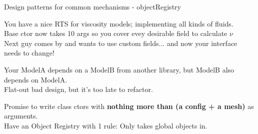 \begin{frame}[fragile]{Design patterns for common mechanisms - objectRegistry}

\begin{description}
    \item[Scenario 1\hspace{2cm}] \hspace{\linewidth}
        You have a nice RTS for viscosity models; implementing all kinds of fluids.\\
        Base ctor now takes 10 args so you cover evey desirable field to calculate $\nu$\\
        Next guy comes by and wants to use custom fields... and now your interface needs to change!\\
    \item[Scenario 2\hspace{2cm}] \hspace{\linewidth}
        Your ModelA depends on a ModelB from another library, but ModelB also depends on ModelA.\\
        Flat-out bad design, but it's too late to refactor.\\
    \item<2>[Solution\hspace{2cm}] \hspace{\linewidth}
        Promise to write class ctors with {\bf nothing more than (a config + a mesh)} as arguments.\\ 
        Have an Object Registry with 1 rule: Only takes global objects in.\\
\end{description}

\end{frame}

